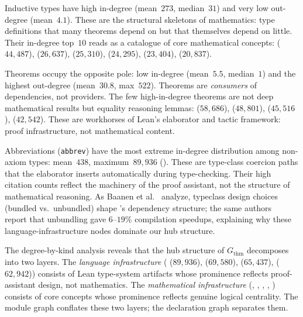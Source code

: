 Inductive types have high in-degree (mean~$273$, median~$31$) and very low out-degree (mean~$4.1$). These are the structural skeletons of mathematics: type definitions that many theorems depend on but that themselves depend on little. Their in-degree top~$10$ reads as a catalogue of core mathematical concepts:  ($44{,}487$),  ($26{,}637$),  ($25{,}310$),  ($24{,}295$),  ($23{,}404$),  ($20{,}837$).

Theorems occupy the opposite pole: low in-degree (mean~$5.5$, median~$1$) and the highest out-degree (mean~$30.8$, max~$522$). Theorems are \emph{consumers} of dependencies, not providers. The few high-in-degree theorems are not deep mathematical results but equality reasoning lemmas:  ($58{,}686$),  ($48{,}801$),  ($45{,}516$),  ($42{,}542$). These are workhorses of Lean's elaborator and tactic framework: proof infrastructure, not mathematical content.

Abbreviations (\texttt{abbrev}) have the most extreme in-degree distribution among non-axiom types: mean~$438$, maximum~$89{,}936$ (). These are type-class coercion paths that the elaborator inserts automatically during type-checking. Their high citation counts reflect the machinery of the proof assistant, not the structure of mathematical reasoning. As Baanen et al.~\cite{baanen2022} analyze, typeclass design choices (bundled vs.\ unbundled) shape 's dependency structure; the same authors~\cite{baanen2025} report that unbundling gave $6$--$19\%$ compilation speedups, explaining why these language-infrastructure nodes dominate our hub structure.

\label{rem:two-layers}
The degree-by-kind analysis reveals that the hub structure of $G_{\mathrm{thm}}$ decomposes into two layers. The \emph{language infrastructure} ( ($89{,}936$),  ($69{,}580$),  ($65{,}437$),  ($62{,}942$)) consists of Lean type-system artifacts whose prominence reflects proof-assistant design, not mathematics. The \emph{mathematical infrastructure} (, , , , ) consists of core concepts whose prominence reflects genuine logical centrality. The module graph conflates these two layers; the declaration graph separates them.

